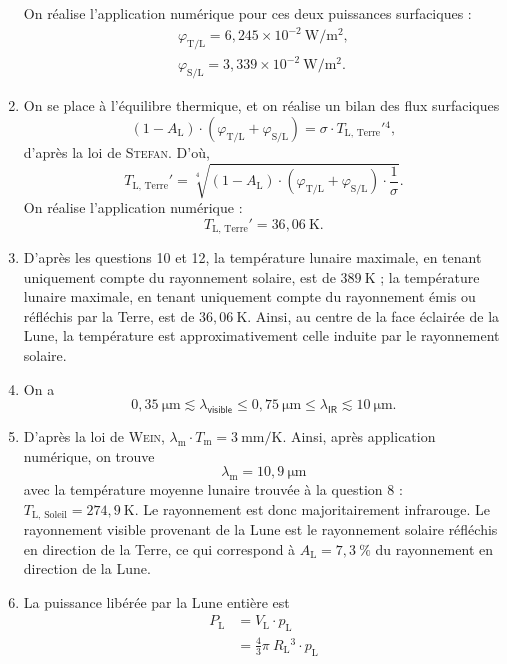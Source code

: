\documentclass[a4paper, 11pt]{article}
\begin{document}
\begin{multicols}{2}
\begin{enumerate}[start=11]
				On réalise l'application numérique pour ces deux puissances surfaciques :
				\begin{gather*}
					\varphi_\mathrm{T / L} = 6{,}245 \times 10^{-2}\:\mathrm{W}/\mathrm{m}^2,\\
					\varphi_\mathrm{S / L} = 3{,}339 \times 10^{-2}\:\mathrm{W}/\mathrm{m}^2.
				\end{gather*}
			\item On se place à l'équilibre thermique, et on réalise un bilan des flux surfaciques \[
					(1 - A_\mathrm{L})\cdot (\varphi_\mathrm{T / L} + \varphi_\mathrm{S / L}) = \sigma\cdot T_\mathrm{L,\,Terre}'{}^4,
				\] d'après la loi de \textsc{Stefan}.
				D'où, \[
					\boxed{T_\mathrm{L,\, Terre}' = \sqrt[4]{(1-A_\mathrm{L}) \cdot (\varphi_\mathrm{T / L} + \varphi_\mathrm{S / L}) \cdot \frac{1}{\sigma}}.}
				\] On réalise l'application numérique : \[
				T_\mathrm{L,\,Terre}' = 36{,}06\:\mathrm{K}
				.\]
			\item D'après les questions 10 et 12, la température lunaire maximale, en tenant uniquement compte du rayonnement solaire, est de $389\:\mathrm{K}$\/ ; la température lunaire maximale, en tenant uniquement compte du rayonnement émis ou réfléchis par la Terre, est de $36{,}06\:\mathrm{K}$.
				Ainsi, au centre de la face éclairée de la Lune, la température est approximativement celle induite par le rayonnement solaire.
			\item On a \[
					\!\!\!\!\!\!\!\!\boxed{0{,}35\:\mathrm{\mu m} \lesssim \lambda_\textsf{visible} \le 0{,}75\:\mathrm{\mu m} \le \lambda_\textsf{IR} \lesssim 10\:\mathrm{\mu m}.}
				\]
			\item D'après la loi de \textsc{Wein}, $\lambda_\mathrm{m} \cdot T_\mathrm{m} = 3\:\mathrm{mm}/\mathrm{K}$. Ainsi, après application numérique, on trouve \[
					\lambda_\mathrm{m} = 10,9\:\mathrm{\mu m}
				\] avec la température moyenne lunaire trouvée à la question 8 : $T_\mathrm{L,\,Soleil} = 274{,}9\:\mathrm{K}$.
				Le rayonnement est donc majoritairement infrarouge.
				Le rayonnement visible provenant de la Lune est le rayonnement solaire réfléchis en direction de la Terre, ce qui correspond à $A_\mathrm{L} = 7{,}3\:\%$\/ du rayonnement en direction de la Lune.
			\item La puissance libérée par la Lune entière est
				\begin{align*}
					P_\mathrm{L} &= V_\mathrm{L} \cdot p_\mathrm{L}\\
					&= \frac{4}{3}\pi\: R_\mathrm{L}{}^3 \cdot p_\mathrm{L}  \\

\end{align*}
\end{enumerate}
\end{multicols}
\end{document}
